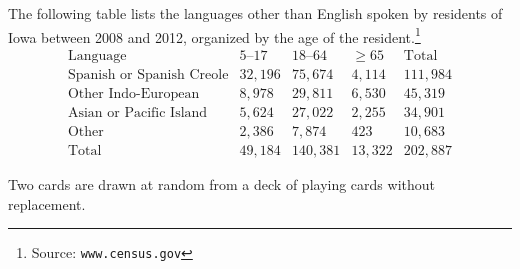 \documentclass[answers,addpoints,12pt]{exam}
\begin{document}
\begin{questions}
\question The following table lists
the languages other than English spoken by residents
of Iowa between 2008 and 2012, organized by the age
of the resident.\footnote{Source: {\tt www.census.gov}}
\[\begin{array}{r|rrr|r}
\text{Language}&\text{$5$--$17$}
&\text{$18$--$64$}&\ge 65&\text{Total}\\\hline
\text{Spanish or Spanish Creole}&32,196&75,674&4,114&111,984\\
\text{Other Indo-European}&8,978&29,811&6,530&45,319\\
\text{Asian or Pacific Island}&5,624&27,022&2,255&34,901\\
\text{Other}&2,386&7,874&423&10,683\\\hline
\text{Total}&49,184&140,381&13,322&202,887
\end{array}\]

\question Two cards are drawn at random from a deck of playing cards
without replacement.
\begin{solution}
\begin{parts}

\end{parts}
\end{solution}
\end{questions}
\end{document}
